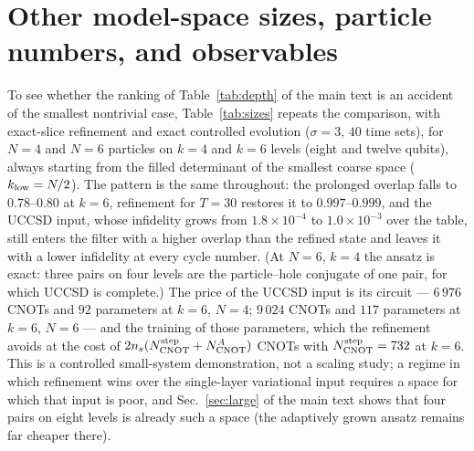 \documentclass[aps,prc,reprint,superscriptaddress,floatfix,nofootinbib]{revtex4-2}
\begin{document}
\section{Other model-space sizes, particle numbers, and observables}
\label{sm:sizes}
To see whether the ranking of Table~\ref{tab:depth} of the main text is an accident of the
smallest nontrivial case, Table~\ref{tab:sizes} repeats the comparison, with
exact-slice refinement and exact controlled evolution ($\sigma=3$, $40$ time
sets), for $N=4$ and $N=6$ particles on $k=4$ and $k=6$ levels (eight and
twelve qubits), always starting from the filled determinant of the smallest
coarse space ($k_{\rm low}=N/2$).  The pattern is the same throughout: the
prolonged overlap falls to $0.78$--$0.80$ at $k=6$, refinement for $T=30$
restores it to $0.997$--$0.999$, and the UCCSD input, whose infidelity grows
from $1.8\times10^{-4}$ to $1.0\times10^{-3}$ over the table, still enters the
filter with a higher overlap than the refined state and leaves it with a lower
infidelity at every cycle number.  (At $N=6$, $k=4$ the ansatz is exact: three
pairs on four levels are the particle--hole conjugate of one pair, for which
UCCSD is complete.)  The price of the UCCSD input is its circuit ---
$6\,976$ CNOTs and $92$ parameters at $k=6$, $N=4$; $9\,024$ CNOTs and $117$
parameters at $k=6$, $N=6$ --- and the training of those parameters, which the
refinement avoids at the cost of $2n_s(N_{\rm CNOT}^{\rm step}+N_{\rm CNOT}^{A})$
CNOTs with $N_{\rm CNOT}^{\rm step}=732$ at $k=6$.  This is a controlled
small-system demonstration, not a scaling study; a regime in which refinement
wins over the single-layer variational input requires a space for which that
input is poor, and Sec.~\ref{sec:large} of the main text shows that four
pairs on eight levels is already such a space (the adaptively grown ansatz
remains far cheaper there).
\end{document}
